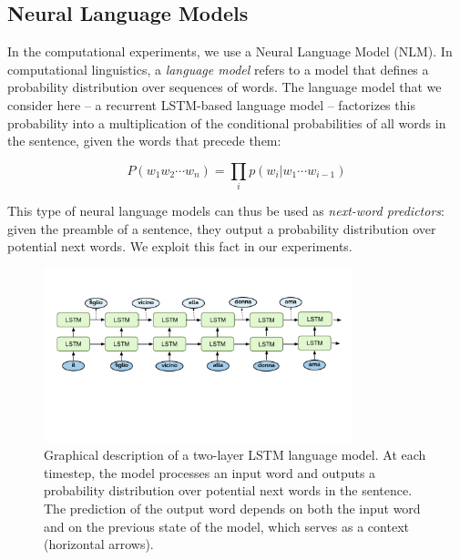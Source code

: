 \subsection{Neural Language Models}
In the computational experiments, we use a Neural Language Model (NLM).
In computational linguistics, a \emph{language model} refers to a model that defines a probability distribution over sequences of words.
The language model that we consider here -- a recurrent LSTM-based language model \citep{Hochreiter:Schmidhuber:1997} -- factorizes this probability into a multiplication of the conditional probabilities of all words in the sentence, given the words that precede them:

\begin{equation}
    P(w_1 w_2 \cdots w_n) = \prod_i p(w_i|w_1 \cdots w_{i-1})
\end{equation}

This type of neural language models can thus be used as \emph{next-word predictors}: given the preamble of a sentence, they output a probability distribution over potential next words.
We exploit this fact in our experiments.

\begin{figure}
    \centering
    \includegraphics[width=0.8\textwidth, clip, trim={10mm 50mm 10mm 20mm}]{figures/LM-image}
    \caption{Graphical description of a two-layer LSTM language model. At each timestep, the model processes an input word and outputs a probability distribution over potential next words in the sentence. The prediction of the output word depends on both the input word and on the previous state of the model, which serves as a context (horizontal arrows).} 
\end{figure}

